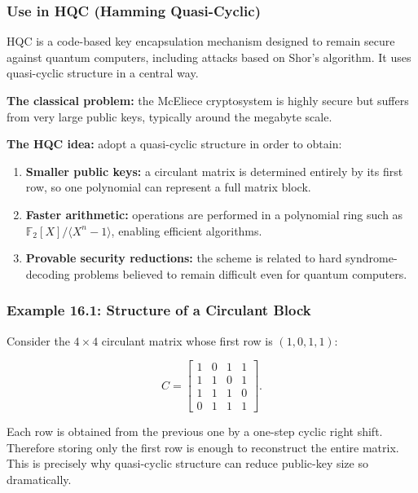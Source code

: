 \documentclass[
]{article}
\providecommand{\tightlist}{%
  \setlength{\itemsep}{0pt}\setlength{\parskip}{0pt}}
\begin{document}
\subsubsection{Use in HQC (Hamming
Quasi-Cyclic)}\label{use-in-hqc-hamming-quasi-cyclic}

HQC is a code-based key encapsulation mechanism designed to remain
secure against quantum computers, including attacks based on Shor's
algorithm. It uses quasi-cyclic structure in a central way.

\textbf{The classical problem:} the McEliece cryptosystem is highly
secure but suffers from very large public keys, typically around the
megabyte scale.

\textbf{The HQC idea:} adopt a quasi-cyclic structure in order to
obtain:

\begin{enumerate}
\def\labelenumi{\arabic{enumi}.}
\tightlist
\item
  \textbf{Smaller public keys:} a circulant matrix is determined
  entirely by its first row, so one polynomial can represent a full
  matrix block.
\item
  \textbf{Faster arithmetic:} operations are performed in a polynomial
  ring such as \(\mathbb{F}_2[X]/\langle X^n-1 \rangle\), enabling
  efficient algorithms.
\item
  \textbf{Provable security reductions:} the scheme is related to hard
  syndrome-decoding problems believed to remain difficult even for
  quantum computers.
\end{enumerate}

\subsubsection{Example 16.1: Structure of a Circulant
Block}\label{example-16.1-structure-of-a-circulant-block}

Consider the \(4 \times 4\) circulant matrix whose first row is
\((1,0,1,1)\):

\[C = \begin{bmatrix}
1 & 0 & 1 & 1 \\
1 & 1 & 0 & 1 \\
1 & 1 & 1 & 0 \\
0 & 1 & 1 & 1
\end{bmatrix}.\]

Each row is obtained from the previous one by a one-step cyclic right
shift. Therefore storing only the first row is enough to reconstruct the
entire matrix. This is precisely why quasi-cyclic structure can reduce
public-key size so dramatically.
\end{document}
